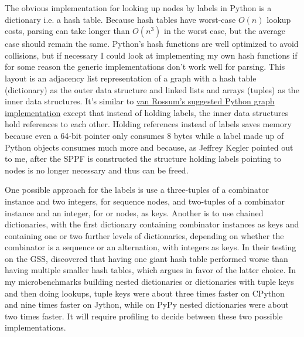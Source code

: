 \documentclass[12pt]{article}
\begin{document}
The obvious implementation for looking up nodes by labels in Python is
a dictionary i.e. a hash table.  Because hash tables have worst-case
$O(n)$ lookup costs, parsing can take longer than $O(n^3)$ in the
worst case, but the average case should remain the same.  Python's
hash functions are well optimized to avoid collisions, but if
necessary I could look at implementing my own hash functions if for
some reason the generic implementations don't work well for parsing.
This layout is an adjacency list representation of a graph with a hash
table (dictionary) as the outer data structure and linked lists and
arrays (tuples) as the inner data structures.  It's similar to
\href{https://www.python.org/doc/essays/graphs/}{van Rossum's
  suggested Python graph implementation} except that instead of
holding labels, the inner data structures hold references to each
other.  Holding references instead of labels saves memory because even
a 64-bit pointer only consumes 8 bytes while a label made up of Python
objects consumes much more and because, as Jeffrey Kegler pointed out
to me, after the SPPF is constructed the structure holding labels
pointing to nodes is no longer necessary and thus can be freed.

One possible approach for the labels is use a three-tuples of a
combinator instance and two integers, for sequence nodes, and
two-tuples of a combinator instance and an integer, for or nodes, as
keys.  Another is to use chained dictionaries, with the first
dictionary containing combinator instances as keys and containing one
or two further levels of dictionaries, depending on whether the
combinator is a sequence or an alternation, with integers as keys.  In
their testing on the GSS, \textcite{afroozeh_izmaylova} discovered
that having one giant hash table performed worse than having multiple
smaller hash tables, which argues in favor of the latter choice.  In
my microbenchmarks building nested dictionaries or dictionaries with
tuple keys and then doing lookups, tuple keys were about three times
faster on CPython and nine times faster on Jython, while on PyPy
nested dictionaries were about two times faster.  It will require
profiling to decide between these two possible implementations.
\end{document}
